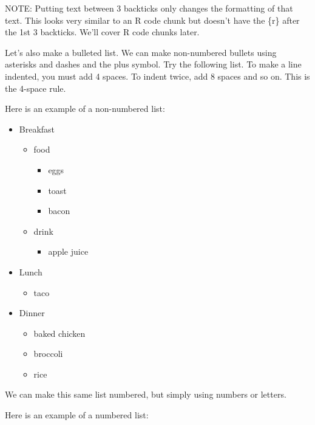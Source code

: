 \documentclass[
]{book}
\providecommand{\tightlist}{%
  \setlength{\itemsep}{0pt}\setlength{\parskip}{0pt}}
\begin{document}
NOTE: Putting text between 3 backticks only changes the formatting of that text. This looks very similar to an R code chunk but doesn't have the \{r\} after the 1st 3 backticks. We'll cover R code chunks later.

Let's also make a bulleted list. We can make non-numbered bullets using asterisks and dashes and the plus symbol. Try the following list. To make a line indented, you must add 4 spaces. To indent twice, add 8 spaces and so on. This is the 4-space rule.

Here is an example of a non-numbered list:

\begin{itemize}
\tightlist
\item
  Breakfast

  \begin{itemize}
  \tightlist
  \item
    food

    \begin{itemize}
    \tightlist
    \item
      eggs
    \item
      toast
    \item
      bacon
    \end{itemize}
  \item
    drink

    \begin{itemize}
    \tightlist
    \item
      apple juice
    \end{itemize}
  \end{itemize}
\item
  Lunch

  \begin{itemize}
  \tightlist
  \item
    taco
  \end{itemize}
\item
  Dinner

  \begin{itemize}
  \tightlist
  \item
    baked chicken
  \item
    broccoli
  \item
    rice
  \end{itemize}
\end{itemize}

We can make this same list numbered, but simply using numbers or letters.

Here is an example of a numbered list:
\end{document}
